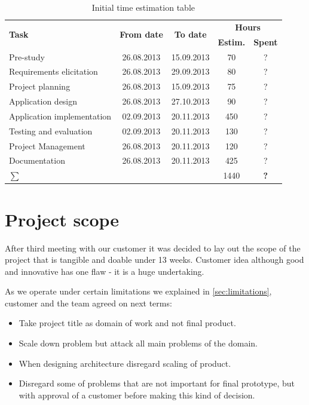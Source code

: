 \begin{table}[!h]
	\caption{Initial time estimation table}
	\label{tab:initial-time-estimation}
	\def\arraystretch{1.25}
	\begin{tabularx}{\textwidth}{Xcccc}
		\toprule[1mm]
		\multirow{2}{*}{\textbf{Task}} &
		\multirow{2}{*}{\textbf{From date}} & 
		\multirow{2}{*}{\textbf{To date}} & 
		\multicolumn{2}{c}{\textbf{Hours}} \\
 				& & & \textbf{Estim.} & \textbf{Spent} \\
		\midrule
		Pre-study 					& 26.08.2013 & 15.09.2013 & 70 &  ?\\
		Requirements elicitation 	& 26.08.2013 & 29.09.2013 & 80 &  ?\\
		Project planning			& 26.08.2013 & 15.09.2013 &	75 &  ?\\
		Application design 			& 26.08.2013 & 27.10.2013 & 90 &  ?\\
		Application implementation	& 02.09.2013 & 20.11.2013 &	450 &  ?\\
		Testing and evaluation 		& 02.09.2013 & 20.11.2013 & 130 &	?\\
		Project Management  		& 26.08.2013 & 20.11.2013 & 120 &  ?\\
		Documentation				& 26.08.2013 & 20.11.2013 &	425 &  ?\\
		\midrule		
		\textbf{$\sum$}	& &	&		1440	& \textbf{?} \\								
		\bottomrule[1mm]
	\end{tabularx}
\end{table}


\section{Project scope}
After third meeting with our customer it was decided to lay out the scope of the project that is tangible and doable under 13 weeks. Customer idea although good and innovative has one flaw - it is a huge undertaking.

As we operate under certain limitations we explained in \ref{sec:limitations}, customer and the team agreed on next terms:
\begin{itemize}
	\item Take project title as domain of work and not final product.
	\item Scale down problem but attack all main problems of the domain.
	\item When designing architecture disregard scaling of product.
	\item Disregard some of problems that are not important for final prototype, but with approval of a customer before making this kind of decision.
\end{itemize}

